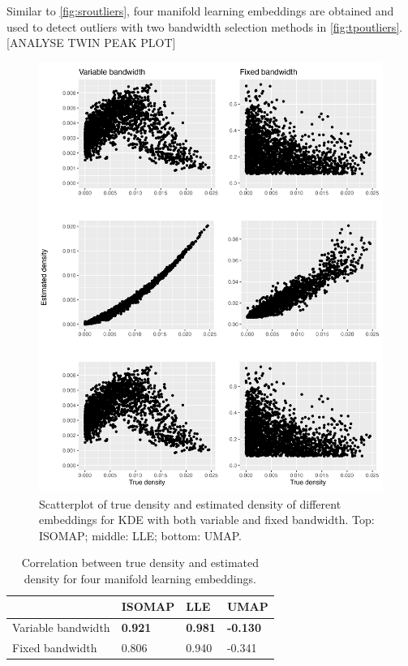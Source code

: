 \documentclass[11pt,a4paper,]{article}
\begin{document}
Similar to \autoref{fig:sroutliers}, four manifold learning embeddings are obtained and used to detect outliers with two bandwidth selection methods in \autoref{fig:tpoutliers}.
{[}ANALYSE TWIN PEAK PLOT{]}

\begin{figure}

{\centering \includegraphics[width=0.95\linewidth]{figures/fived_density_comparison_isomap_riem20} 

}

\caption{Scatterplot of true density and estimated density of different embeddings for KDE with both variable and fixed bandwidth. Top: ISOMAP; middle: LLE; bottom: UMAP.}\label{fig:fivedisomapden}
\end{figure}

\begin{table}

\caption{\label{tab:fivedcors}Correlation between true density and estimated density for four manifold learning embeddings.}
\centering
\begin{tabular}[t]{l>{}l>{}l>{}l}
\toprule
  & ISOMAP & LLE & UMAP\\
\midrule
Variable bandwidth & \textbf{0.921} & \textbf{0.981} & \textbf{-0.130}\\
Fixed bandwidth & 0.806 & 0.940 & -0.341\\
\bottomrule
\end{tabular}
\end{table}
\end{document}
